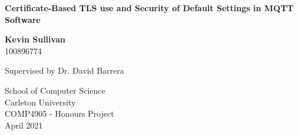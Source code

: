 \begin{titlepage}
    \begin{center}
        \vspace*{1cm}
            
        \Huge
        \textbf{Certificate-Based TLS use and Security of Default Settings in MQTT Software}
            
        \vspace{1.5cm}
        \Large  
        \textbf{Kevin Sullivan}\\100896774
            
        \vfill
        Supervised by Dr. David Barrera
        
        \vspace{0.8cm}

            
        \Large
        School of Computer Science \\
        Carleton University\\
        COMP4905 - Honours Project\\
        April 2021
            
    \end{center}
\end{titlepage}